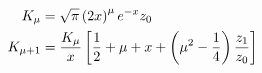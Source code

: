 \documentclass[12pt]{article}
\begin{document}
\begin{align}
K_\mu &= \sqrt{\pi} \left(2x\right)^\mu e^{-x} z_0 \notag \\
K_{\mu+1} &= \frac{K_\mu}{x} \left[\frac{1}{2}+\mu+x+\left(\mu^2-\frac{1}{4}\right)\frac{z_1}{z_0}\right] \notag
\end{align}
\end{document}
